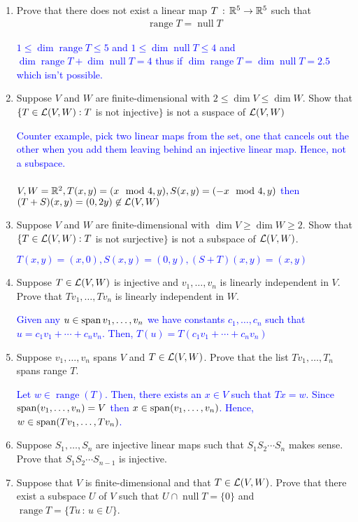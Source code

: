 \documentclass[10pt,a4paper]{report}
\DeclareMathOperator{\RANGE}{range}
\DeclareMathOperator{\NULL}{null}
\newcommand{\BLUE}[1]{\textcolor{blue}{#1}}
\begin{document}
\begin{enumerate}
\item Prove that there does not exist a linear map $T\,:\,\mathbb{R}^5\to\mathbb{R}^5$ such that 
\begin{align*}
	\RANGE T = \NULL T
\end{align*}

\BLUE{$1\le \dim \RANGE T\le 5$ and $1\le \dim \NULL T\le 4$ and $\dim \RANGE T + \dim\NULL T = 4$  thus if $\dim \RANGE T = \dim\NULL T = 2.5$ which isn't possible.
}

\item Suppose $V$ and $W$ are finite-dimensional with $2 \le \dim V \le \dim W$.  Show that $\{T\in \mathcal{L}(V,W):T$ is not injective$\}$ is not a suspace of $\mathcal{L}(V,W)$

\BLUE{Counter example, pick two linear maps from the set, one that cancels out the other when you add them leaving behind an injective linear map. Hence, not a subspace.\\
\\
$V, W = \mathbb{R}^2, T(x,y)=(x \mod 4, y), S(x,y)=(-x\mod 4, y)$ then $(T+S)(x,y)=(0, 2y) \not \in \mathcal{L}(V,W)$
}

\item Suppose $V$ and $W$ are finite-dimensional with $\dim V \ge\dim W\ge 2$.  Show that $\{T\in \mathcal{L}(V,W):T$ is not surjective$\}$ is not a subspace of $\mathcal{L}(V,W)$.

\BLUE{$T(x,y)=(x,0), S(x,y)=(0,y), (S+T)(x,y)=(x,y)$
}

\item Suppose $T \in\mathcal{L}(V,W)$ is injective and $v_1,\dots,v_n$ is linearly independent in $V$.  Prove that $Tv_1,\dots,Tv_n$ is linearly independent in $W$.

\BLUE{Given any $u \in \operatorname{span}{v_1, \dots, v_n}$ we have constants $c_1,\dots,c_n$ such that $u=c_1v_1+\cdots+c_nv_n$.  Then, $T(u)=T(c_1v_1+\cdots+c_nv_n)$
}

\item Suppose $v_1,\dots,v_n$ spans $V$ and $T \in \mathcal{L}(V,W)$.  Prove that the list $Tv_1,\dots,T_n$ spans range $T$.

\BLUE{Let $w \in \RANGE(T)$.  Then, there exists an $x \in V$ such that $Tx=w$.  Since $\operatorname{span}(v_1, \dots, v_n) = V$ then $x \in \operatorname{span}(v_1, \dots, v_n)$.  Hence, $w \in \operatorname{span}(Tv_1, \dots, Tv_n)$.
}

\item Suppose $S_1,\dots,S_n$ are injective linear maps such that $S_1S_2\cdots  S_n$ makes sense.  Prove that $S_1S_2\cdots S_{n-1}$ is injective.

\item Suppose that $V$ is finite-dimensional and that $T \in \mathcal{L}(V,W)$.  Prove that there exist a subspace $U$ of $V$ such that $U \cap \NULL T = \{0\}$ and $\RANGE T=\{Tu\,:\,u\in U\}$.


\end{enumerate}
\end{document}
